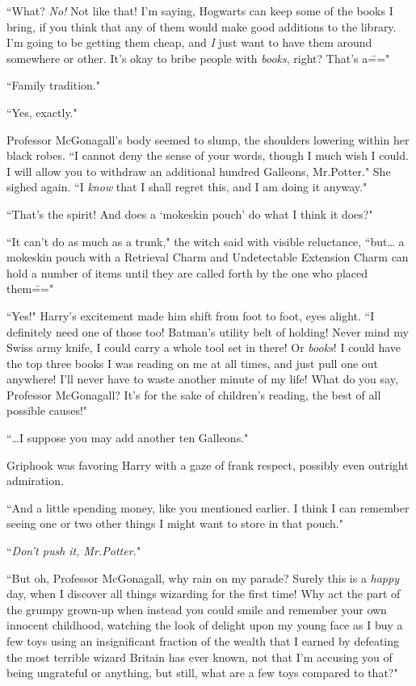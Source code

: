 ``What? \emph{No!} Not like that! I'm saying, Hogwarts can keep some of the books I bring, if you think that any of them would make good additions to the library. I'm going to be getting them cheap, and \emph{I} just want to have them around somewhere or other. It's okay to bribe people with \emph{books}, right? That's a\==="

``Family tradition."

``Yes, exactly."

Professor McGonagall's body seemed to slump, the shoulders lowering within her black robes. ``I cannot deny the sense of your words, though I much wish I could. I will allow you to withdraw an additional hundred Galleons, Mr.\?Potter." She sighed again. ``I \emph{know} that I shall regret this, and I am doing it anyway."

``That's the spirit! And does a `mokeskin pouch' do what I think it does?"

``It can't do as much as a trunk," the witch said with visible reluctance, ``but{\ldots} a mokeskin pouch with a Retrieval Charm and Undetectable Extension Charm can hold a number of items until they are called forth by the one who placed them\==="

``Yes!" Harry's excitement made him shift from foot to foot, eyes alight. ``I definitely need one of those too! Batman's utility belt of holding! Never mind my Swiss army knife, I could carry a whole tool set in there! Or \emph{books}! I could have the top three books I was reading on me at all times, and just pull one out anywhere! I'll never have to waste another minute of my life! What do you say, Professor McGonagall? It's for the sake of children's reading, the best of all possible causes!"

``{\ldots}I suppose you may add another ten Galleons."

Griphook was favoring Harry with a gaze of frank respect, possibly even outright admiration.

``And a little spending money, like you mentioned earlier. I think I can remember seeing one or two other things I might want to store in that pouch."

``\emph{Don't push it, Mr.\?Potter.}"

``But oh, Professor McGonagall, why rain on my parade? Surely this is a \emph{happy} day, when I discover all things wizarding for the first time! Why act the part of the grumpy grown-up when instead you could smile and remember your own innocent childhood, watching the look of delight upon my young face as I buy a few toys using an insignificant fraction of the wealth that I earned by defeating the most terrible wizard Britain has ever known, not that I'm accusing you of being ungrateful or anything, but still, what are a few toys compared to that?"

